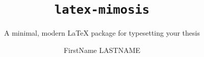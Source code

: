 \newcommand{\authorname}{FirstName LASTNAME}
\newcommand{\universityname}{Example University}
\newcommand{\facultyname}{Master's Degree -- Computer Science}

\title{\texttt{latex-mimosis}}
\subtitle{A minimal, modern \LaTeX{} package for typesetting your thesis}
\author{\authorname}
\newcommand{\university}{\universityname}
\newcommand{\program}{\facultyname}
